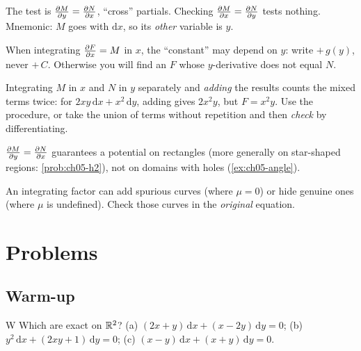 \begin{pitfall}\label{pit:ch05-wrong-test}
The test is $\frac{\partial M}{\partial y} = \frac{\partial N}{\partial x}$, ``cross'' partials. Checking
$\frac{\partial M}{\partial x} = \frac{\partial N}{\partial y}$ tests nothing. Mnemonic: $M$ goes with
$\mathrm{d}x$, so its \emph{other} variable is $y$.
\end{pitfall}

\begin{pitfall}\label{pit:ch05-constant}
When integrating $\frac{\partial F}{\partial x} = M$ in $x$, the ``constant'' may depend on $y$:
write $+\,g(y)$, never $+\,C$. Otherwise you will find an $F$ whose
$y$-derivative does not equal $N$.
\end{pitfall}

\begin{pitfall}\label{pit:ch05-double}
Integrating $M$ in $x$ and $N$ in $y$ separately and \emph{adding} the results
counts the mixed terms twice: for $2xy\,\mathrm{d}x + x^2\,\mathrm{d}y$, adding
gives $2x^2y$, but $F = x^2y$. Use the procedure, or take the union of terms
without repetition and then \emph{check} by differentiating.
\end{pitfall}

\begin{pitfall}\label{pit:ch05-domain}
$\frac{\partial M}{\partial y} = \frac{\partial N}{\partial x}$ guarantees a potential on rectangles (more
generally on star-shaped regions: \cref{prob:ch05-h2}), not on domains with
holes (\cref{ex:ch05-angle}).
\end{pitfall}

\begin{pitfall}\label{pit:ch05-mu-zero}
An integrating factor can add spurious curves (where $\mu = 0$) or hide genuine
ones (where $\mu$ is undefined). Check those curves in the \emph{original}
equation.
\end{pitfall}

\section{Problems}\label{sec:ch05-problems}

\subsection*{Warm-up}

\begin{problem}{W}\label{prob:ch05-w1}
Which are exact on $\mathbb{R}^2$?
(a) $(2x + y)\,\mathrm{d}x + (x - 2y)\,\mathrm{d}y = 0$;
(b) $y^2\,\mathrm{d}x + (2xy + 1)\,\mathrm{d}y = 0$;
(c) $(x - y)\,\mathrm{d}x + (x + y)\,\mathrm{d}y = 0$.
\end{problem}


